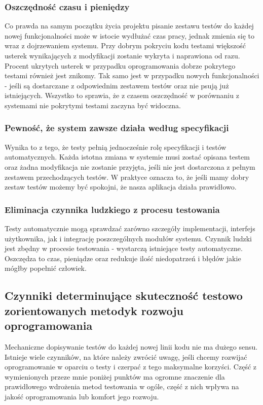   \subsubsection{Oszczędność czasu i pieniędzy}
  Co prawda na samym początku życia projektu pisanie zestawu testów do każdej nowej funkcjonalności może w istocie wydłużać czas pracy, jednak zmienia się to wraz z dojrzewaniem systemu. Przy dobrym pokryciu kodu testami większość usterek wynikających z modyfikacji zostanie wykryta i naprawiona od razu. Procent ukrytych usterek w przypadku oprogramowania dobrze pokrytego testami również jest znikomy. Tak samo jest w przypadku nowych funkcjonalności - jeśli są dostarczane z odpowiednim zestawem testów oraz nie psują już istniejących. Wszystko to sprawia, że z czasem oszczędność w porównaniu z systemami nie pokrytymi testami zaczyna być widoczna.
  
  \subsubsection{Pewność, że system zawsze działa według specyfikacji}
  Wynika to z tego, że testy pełnią jednocześnie rolę specyfikacji i testów automatycznych. Każda istotna zmiana w systemie musi zostać opisana testem oraz żadna modyfikacja nie zostanie przyjęta, jeśli nie jest dostarczona z pełnym zestawem przechodzących testów. W praktyce oznacza to, że jeśli mamy dobry zestaw testów możemy być spokojni, że nasza aplikacja działa prawidłowo.
  
  \subsubsection{Eliminacja czynnika ludzkiego z procesu testowania}
  Testy automatycznie mogą sprawdzać zarówno szczegóły implementacji, interfejs użytkownika, jak i integrację poszczególnych modułów systemu. Czynnik ludzki jest zbędny w procesie testowania - wystarczą istniejące testy automatyczne. Oszczędza to czas, pieniądze oraz redukuje ilość niedopatrzeń i błędów jakie mógłby popełnić człowiek.
    
  \subsection{Czynniki determinujące skuteczność testowo zorientowanych metodyk rozwoju oprogramowania}
  Mechaniczne dopisywanie testów do każdej nowej linii kodu nie ma dużego sensu. Istnieje wiele czynników, na które należy zwrócić uwagę, jeśli chcemy rozwijać oprogramowanie w oparciu o testy i czerpać z tego maksymalne korzyści. Część z wymienionych przeze mnie poniżej punktów ma ogromne znaczenie dla prawidłowego wdrożenia metod testowania w ogóle, część z nich wpływa na jakość oprogramowania lub komfort jego rozwoju.
  
